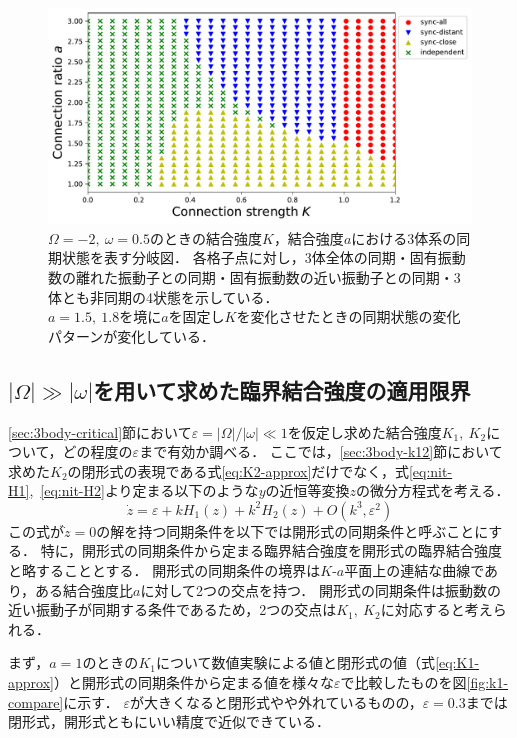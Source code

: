 \documentclass[../main]{subfiles}
\begin{document}
\begin{figure}[tbp]
\centering
\includegraphics[width=135mm]{./images/three-body-phase-boundary.pdf}
\centering
\caption{$\Omega=-2,\ \omega=0.5$のときの結合強度$K$，結合強度$a$における3体系の同期状態を表す分岐図．
各格子点に対し，3体全体の同期・固有振動数の離れた振動子との同期・固有振動数の近い振動子との同期・3体とも非同期の4状態を示している．\\
$a=1.5,\ 1.8$を境に$a$を固定し$K$を変化させたときの同期状態の変化パターンが変化している．}
\label{fig:3body-phase-boundary}
\end{figure}

\subsection{$|\Omega|\gg|\omega|$を用いて求めた臨界結合強度の適用限界}
\ref{sec:3body-critical}節において$\varepsilon=|\Omega|/|\omega|\ll 1$を仮定し求めた結合強度$K_1,\ K_2$について，どの程度の$\varepsilon$まで有効か調べる．
ここでは，\ref{sec:3body-k12}節において求めた$K_2$の閉形式の表現である式\eqref{eq:K2-approx}だけでなく，式\eqref{eq:nit-H1},\ \eqref{eq:nit-H2}より定まる以下のような$y$の近恒等変換$z$の微分方程式を考える．
\begin{equation}
    \label{eq:k1k2-open}
    \dot{z}=\varepsilon+kH_1(z)+k^2H_2(z)+O(k^3,\varepsilon^2)
\end{equation}
この式が$\dot{z}=0$の解を持つ同期条件を以下では開形式の同期条件と呼ぶことにする．
特に，開形式の同期条件から定まる臨界結合強度を開形式の臨界結合強度と略することとする．
開形式の同期条件の境界は$K$-$a$平面上の連結な曲線であり，ある結合強度比$a$に対して2つの交点を持つ．
開形式の同期条件は振動数の近い振動子が同期する条件であるため，2つの交点は$K_1,\ K_2$に対応すると考えられる．

まず，$a=1$のときの$K_1$について数値実験による値と閉形式の値（式\eqref{eq:K1-approx}）と開形式の同期条件から定まる値を様々な$\varepsilon$で比較したものを図\ref{fig:k1-compare}に示す．
$\varepsilon$が大きくなると閉形式やや外れているものの，$\varepsilon=0.3$までは閉形式，開形式ともにいい精度で近似できている．
\end{document}
